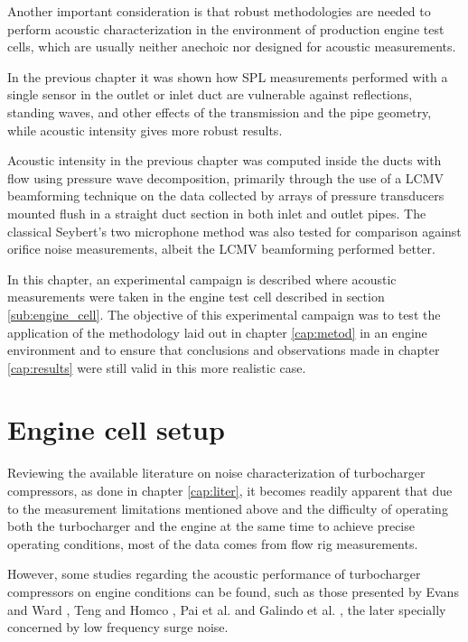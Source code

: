 Another important consideration is that robust methodologies are needed to perform acoustic characterization in the environment of production engine test cells, which are usually neither anechoic nor designed for acoustic measurements.

In the previous chapter it was shown how SPL measurements performed with a single sensor in the outlet or inlet duct are vulnerable against reflections, standing waves, and other effects of the transmission and the pipe geometry, while acoustic intensity gives more robust results.

Acoustic intensity in the previous chapter was computed inside the ducts with flow using pressure wave decomposition, primarily through the use of a LCMV beamforming technique on the data collected by arrays of pressure transducers mounted flush in a straight duct section in both inlet and outlet pipes. The classical Seybert's two microphone method \cite{seybert1988two} was also tested for comparison against orifice noise measurements, albeit the LCMV beamforming performed better.

In this chapter, an experimental campaign is described where acoustic measurements were taken in the engine test cell described in section \ref{sub:engine_cell}. The objective of this experimental campaign was to test the application of the methodology laid out in chapter \ref{cap:metod} in an engine environment and to ensure that conclusions and observations made in chapter \ref{cap:results} were still valid in this more realistic case.

\section{Engine cell setup}
\label{sec:experimental_characterization}

Reviewing the available literature on noise characterization of turbocharger compressors, as done in chapter \ref{cap:liter}, it becomes readily apparent that due to the measurement limitations mentioned above and the difficulty of operating both the turbocharger and the engine at the same time to achieve precise operating conditions, most of the data comes from flow rig measurements.

However, some studies regarding the acoustic performance of turbocharger compressors on engine conditions can be found, such as those presented by Evans and Ward \cite{evans2005minimizing,evans2006reduction}, Teng and Homco \cite{teng2009investigation},  Pai et al. \cite{pai2013air,pai2015turbocharger} and Galindo et al. \cite{galindo2013engine,galindo2011measurement,galindo2008experiments}, the later specially concerned by low frequency surge noise.


